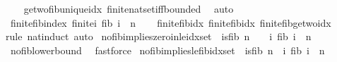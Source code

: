 \begin{isabellebody}
%
\isadelimproof
\ \ %
\endisadelimproof
%
\isatagproof
{}\isamarkupfalse%
\ ge{\isacharunderscore}{\kern0pt}two{\isacharunderscore}{\kern0pt}fib{\isacharunderscore}{\kern0pt}unique{\isacharunderscore}{\kern0pt}idx\ finite{\isacharunderscore}{\kern0pt}nat{\isacharunderscore}{\kern0pt}set{\isacharunderscore}{\kern0pt}iff{\isacharunderscore}{\kern0pt}bounded\ \isamarkupfalse%
\ auto%
\endisatagproof
{\isafoldproof}%
%
\isadelimproof
\isanewline
%
\endisadelimproof
\isanewline
{}\isamarkupfalse%
\ finite{\isacharunderscore}{\kern0pt}fib{\isacharunderscore}{\kern0pt}index{\isacharcolon}{\kern0pt}\ {\isachardoublequoteopen}finite{\isacharparenleft}{\kern0pt}{\isacharbraceleft}{\kern0pt}i{\isachardot}{\kern0pt}\ fib\ i\ {\isacharequal}{\kern0pt}\ n{\isacharbraceright}{\kern0pt}{\isacharparenright}{\kern0pt}{\isachardoublequoteclose}\isanewline
%
\isadelimproof
\ \ %
\endisadelimproof
%
\isatagproof
{}\isamarkupfalse%
\ finite{\isacharunderscore}{\kern0pt}fib{}{\isacharunderscore}{\kern0pt}idx\ finite{\isacharunderscore}{\kern0pt}fib{}{\isacharunderscore}{\kern0pt}idx\ finite{\isacharunderscore}{\kern0pt}fib{\isacharunderscore}{\kern0pt}ge{\isacharunderscore}{\kern0pt}two{\isacharunderscore}{\kern0pt}idx\ \isamarkupfalse%
{\isacharparenleft}{\kern0pt}rule\ nat{\isacharunderscore}{\kern0pt}induct{}{\isacharcomma}{\kern0pt}\ auto{\isacharparenright}{\kern0pt}%
\endisatagproof
{\isafoldproof}%
%
\isadelimproof
\isanewline
%
\endisadelimproof
\isanewline
{}\isamarkupfalse%
\ no{\isacharunderscore}{\kern0pt}fib{\isacharunderscore}{\kern0pt}implies{\isacharunderscore}{\kern0pt}zero{\isacharunderscore}{\kern0pt}in{\isacharunderscore}{\kern0pt}le{\isacharunderscore}{\kern0pt}idx{\isacharunderscore}{\kern0pt}set{\isacharcolon}{\kern0pt}\ {\isachardoublequoteopen}{\isasymnot}\ is{\isacharunderscore}{\kern0pt}fib\ n\ {\isasymLongrightarrow}\ {}\ {\isasymin}\ {\isacharbraceleft}{\kern0pt}i{\isachardot}{\kern0pt}\ fib\ i\ {\isacharless}{\kern0pt}\ n{\isacharbraceright}{\kern0pt}{\isachardoublequoteclose}\isanewline
%
\isadelimproof
\ \ %
\endisadelimproof
%
\isatagproof
{}\isamarkupfalse%
\ no{\isacharunderscore}{\kern0pt}fib{\isacharunderscore}{\kern0pt}lower{\isacharunderscore}{\kern0pt}bound\ \isamarkupfalse%
\ fastforce%
\endisatagproof
{\isafoldproof}%
%
\isadelimproof
\isanewline
%
\endisadelimproof
\isanewline
{}\isamarkupfalse%
\ no{\isacharunderscore}{\kern0pt}fib{\isacharunderscore}{\kern0pt}implies{\isacharunderscore}{\kern0pt}le{\isacharunderscore}{\kern0pt}fib{\isacharunderscore}{\kern0pt}idx{\isacharunderscore}{\kern0pt}set{\isacharcolon}{\kern0pt}\ {\isachardoublequoteopen}{\isasymnot}\ is{\isacharunderscore}{\kern0pt}fib\ n\ {\isasymLongrightarrow}\ {\isacharbraceleft}{\kern0pt}i{\isachardot}{\kern0pt}\ fib\ i\ {\isacharless}{\kern0pt}\ n{\isacharbraceright}{\kern0pt}\ {\isasymnoteq}\ {\isacharbraceleft}{\kern0pt}{\isacharbraceright}{\kern0pt}{\isachardoublequoteclose}\isanewline

\end{isabellebody}

